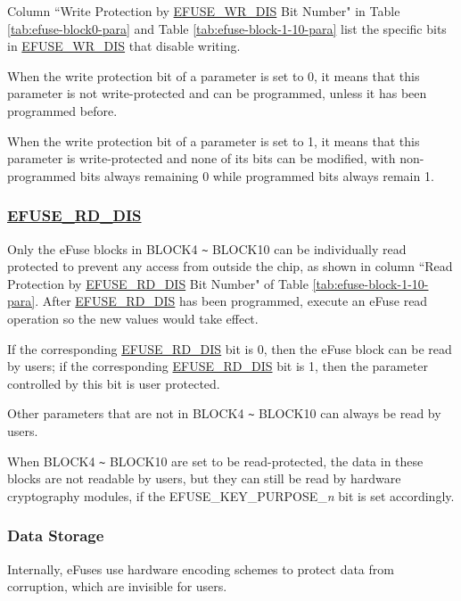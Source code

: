 \documentclass[main\_\_EN.tex]{subfiles}
\begin{document}
Column ``Write Protection by \hyperref[fielddesc:EFUSEWRDIS]{EFUSE\_WR\_DIS} Bit Number" in Table  \ref{tab:efuse-block0-para} and Table \ref{tab:efuse-block-1-10-para} list the specific bits in \hyperref[fielddesc:EFUSEWRDIS]{EFUSE\_WR\_DIS} that disable writing.

When the write protection bit of a parameter is set to 0, it means that this parameter is not write-protected and can be programmed, unless it has been programmed before.

When the write protection bit of a parameter is set to 1, it means that this parameter is write-protected and none of its bits can be modified, with non-programmed bits always remaining 0 while programmed bits always remain 1.

\subsubsection{\hyperref[fielddesc:EFUSERDDIS]{EFUSE\_RD\_DIS}}
\label{sec:efuse-rd-dis}

Only the eFuse blocks in BLOCK4 \verb+~+ BLOCK10 can be individually read protected to prevent any access from outside the chip, as shown in column ``Read Protection by \hyperref[fielddesc:EFUSERDDIS]{EFUSE\_RD\_DIS} Bit Number" of Table \ref{tab:efuse-block-1-10-para}. After \hyperref[fielddesc:EFUSERDDIS]{EFUSE\_RD\_DIS} has been programmed, execute an eFuse read operation so the new values would take effect.

If the corresponding \hyperref[fielddesc:EFUSERDDIS]{EFUSE\_RD\_DIS} bit is 0, then the eFuse block can be read by users; if the corresponding \hyperref[fielddesc:EFUSERDDIS]{EFUSE\_RD\_DIS} bit is 1, then the parameter controlled by this bit is user protected.

Other parameters that are not in BLOCK4 \verb+~+ BLOCK10 can always be read by users.

When BLOCK4 \verb+~+ BLOCK10 are set to be read-protected, the data in these blocks are not readable by users, but they can still be read by hardware cryptography modules, if the EFUSE\_KEY\_PURPOSE\_\textcolor{myred}{\it{n}} bit is set accordingly.

\subsubsection{Data Storage}
\label{sec:efuse-data-storage}

Internally, eFuses use hardware encoding schemes to protect data from corruption, which are invisible for users.
\end{document}
